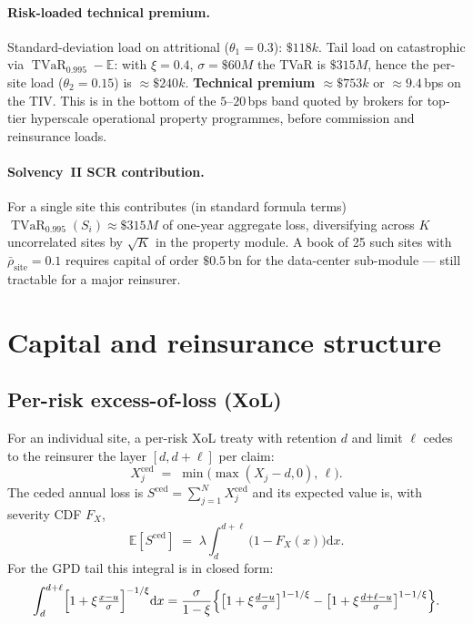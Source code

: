 \documentclass[11pt,a4paper]{article}
\let\origsection\section
\renewcommand{\section}{\clearpage\origsection}
\theoremstyle{ia}
\newcommand{\E}{\mathbb{E}}
\newcommand{\1}{\mathbf{1}}
\newcommand{\TVaR}{\operatorname{TVaR}}
\newcommand{\dd}{\mathrm{d}}
\begin{document}
\begin{ebox}
\paragraph{Risk-loaded technical premium.}
Standard-deviation load on attritional ($\theta_1=0.3$):
$\$118k$. Tail load on catastrophic via
$\TVaR_{0.995}-\E$: with $\xi=0.4$, $\sigma=\$60M$ the TVaR is
$\$315M$, hence the per-site load
($\theta_2=0.15$) is $\approx \$240k$.
\textbf{Technical premium $\approx \$753k$} or
$\approx 9.4$\,bps on the TIV. This is in the bottom of the
$5$--$20$\,bps band quoted by brokers for top-tier hyperscale
operational property programmes, before commission and reinsurance loads.

\paragraph{Solvency~II SCR contribution.}
For a single site this contributes (in standard formula terms)
$\TVaR_{0.995}(S_i)\approx \$315M$ of one-year aggregate loss,
diversifying across $K$ uncorrelated sites by $\sqrt{K}$ in the
property module. A book of 25 such sites with
$\bar\rho_{\mathrm{site}}=0.1$ requires capital of order
$\$0.5$\,bn for the data-center sub-module --- still tractable for
a major reinsurer.
\end{ebox}

\section{Capital and reinsurance structure}\label{sec:capital}

\subsection{Per-risk excess-of-loss (XoL)}

For an individual site, a per-risk XoL treaty with retention
$d$ and limit $\ell$ cedes to the reinsurer the layer $[d, d+\ell]$
per claim:
\begin{equation}\label{eq:xol}
   X^{\mathrm{ced}}_{j} \;=\; \min\bigl(\max(X_j-d, 0),\,\ell\bigr).
\end{equation}
The ceded annual loss is
$S^{\mathrm{ced}}=\sum_{j=1}^N X^{\mathrm{ced}}_j$
and its expected value is, with severity CDF $F_X$,
\begin{equation}\label{eq:xol-mean}
   \E[S^{\mathrm{ced}}] \;=\; \lambda \int_d^{d+\ell}
   \bigl(1-F_X(x)\bigr)\dd x .
\end{equation}
For the GPD tail this integral is in closed form:
\begin{equation}
   \int_d^{d+\ell}\Bigl[1+\xi\tfrac{x-u}{\sigma}\Bigr]^{-1/\xi}\dd x
   = \frac{\sigma}{1-\xi}
     \Bigl\{\bigl[1+\xi\tfrac{d-u}{\sigma}\bigr]^{1-1/\xi}
           -\bigl[1+\xi\tfrac{d+\ell-u}{\sigma}\bigr]^{1-1/\xi}\Bigr\}.
\end{equation}
\end{document}
